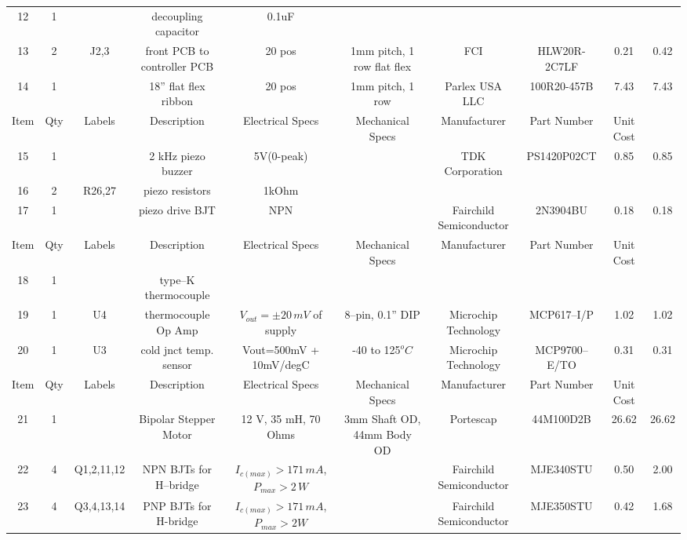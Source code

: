\documentclass[10pt, twocolumn]{article}
\begin{document}
\begin{center}
\begin{adjustbox}{max width=\textwidth}
\begin{tabular}{c c c c c c c c c c}
12	&1	&	&decoupling capacitor	&0.1uF				&
	&		&				&		&	\\

13	&2	&J2,3	&front PCB to controller PCB	&20 pos			&1mm pitch, 1 row flat flex
	&FCI			&HLW20R-2C7LF		&0.21		&0.42	\\

14	&1	&	&18” flat flex ribbon		&20 pos		&1mm pitch, 1 row
	&Parlex USA LLC		&100R20-457B		&7.43		&7.43	\\
\hline
Item	&Qty	&Labels	&Description		&Electrical Specs		&Mechanical Specs
	&Manufacturer		&Part Number		&Unit Cost	&	\\
\hline

15	&1	&	&2 kHz piezo buzzer	&5V(0-peak)			&
	&TDK Corporation	&PS1420P02CT		&0.85		&0.85	\\

16	&2	&R26,27	&piezo resistors	&1kOhm				&
	&			&			&		&	\\

17	&1	&	&piezo drive BJT		&NPN				&
	&Fairchild Semiconductor	&2N3904BU	&0.18		&0.18	\\

\hline
Item	&Qty	&Labels	&Description		&Electrical Specs		&Mechanical Specs
	&Manufacturer		&Part Number		&Unit Cost	&	\\
\hline

18	&1	&	&type--K thermocouple	&				&
	&			&			&		&	\\

19	&1	&U4	&thermocouple Op Amp	&$V_{out}=\pm 20\,mV$ of supply	&8--pin, 0.1” DIP
	&Microchip Technology	&MCP617--I/P		&1.02		&1.02	\\

20	&1	&U3	&cold jnct temp. sensor	&Vout=500mV + 10mV/degC 	&-40 to 125$^{o}C$
	&Microchip Technology	&MCP9700--E/TO		&0.31		&0.31	\\

\hline
Item	&Qty	&Labels	&Description		&Electrical Specs		&Mechanical Specs
	&Manufacturer		&Part Number		&Unit Cost	&	\\
\hline

21	&1	&	&Bipolar Stepper Motor	&12 V, 35 mH, 70 Ohms		&3mm Shaft OD, 44mm Body OD
	&Portescap		&44M100D2B		&26.62		&26.62	\\

22	&4	&Q1,2,11,12	&NPN BJTs for H--bridge	&$I_{c(max)}>171\,mA$, $P_{max}>2\,W$	&
	&Fairchild Semiconductor	&MJE340STU	&0.50		&2.00	\\

23	&4	&Q3,4,13,14	&PNP BJTs for H-bridge	&$I_{c(max)}>171\,mA$, $P_{max}>2W$	&
	&Fairchild Semiconductor	&MJE350STU	&0.42		&1.68	\\


\end{tabular}
\end{adjustbox}
\end{center}
\end{document}
